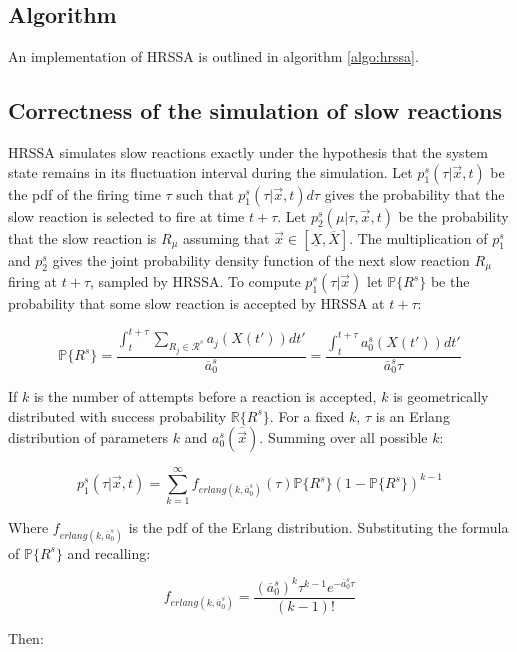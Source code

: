   \subsection{Algorithm}
  An implementation of HRSSA is outlined in algorithm \ref{algo:hrssa}.

  

  \subsection{Correctness of the simulation of slow reactions}
  HRSSA simulates slow reactions exactly under the hypothesis that the system state remains in its fluctuation interval during the simulation.
  Let $p_1^s(\tau|\vec{x},t)$ be the pdf of the firing time $\tau$ such that $p_1^s(\tau|\vec{x},t)d\tau$ gives the probability that the slow reaction is selected to fire at time $t+\tau$.
  Let $p_2^s(\mu|\tau,\vec{x},t)$ be the probability that the slow reaction is $R_\mu$ assuming that $\vec{x}\in[\underline{X},\overline{X}]$.
  The multiplication of $p_1^s$ and $p_2^s$ gives the joint probability density function of the next slow reaction $R_\mu$ firing at $t+\tau$, sampled by HRSSA.
  To compute $p_1^s(\tau|\vec{x})$ let $\mathbb{P}\{R^s\}$ be the probability that some slow reaction is accepted by HRSSA at $t+\tau$:

  $$\mathbb{P}\{R^s\} = \frac{\int_t^{t+\tau}\sum\limits_{R_j\in\mathcal{R}^s}a_j(X(t'))dt'}{\overline{a}_0^s} = \frac{\int_t^{t+\tau}a_0^s(X(t'))dt'}{\overline{a}_0^s\tau}$$

  If $k$ is the number of attempts before a reaction is accepted, $k$ is geometrically distributed with success probability $\mathbb{R}\{R^s\}$.
  For a fixed $k$, $\tau$ is an Erlang distribution of parameters $k$ and $a_0^s(\overline{\vec{x}})$.
  Summing over all possible $k$:

  $$p_1^s(\tau|\vec{x},t) = \sum\limits_{k=1}^{\infty}f_{erlang(k, \overline{a}_0^s)}(\tau) \mathbb{P}\{R^s\}(1-\mathbb{P}\{R^s\})^{k-1}$$

  Where $f_{erlang(k, \overline{a}_0^s)}$ is the pdf of the Erlang distribution.
  Substituting the formula of $\mathbb{P}\{R^s\}$ and recalling:

  $$f_{erlang(k, \overline{a}_0^s)} = \frac{(\overline{a}_0^s)^k\tau^{k-1}e^{-\overline{a}_0^s\tau}}{(k-1)!}$$

  Then:

